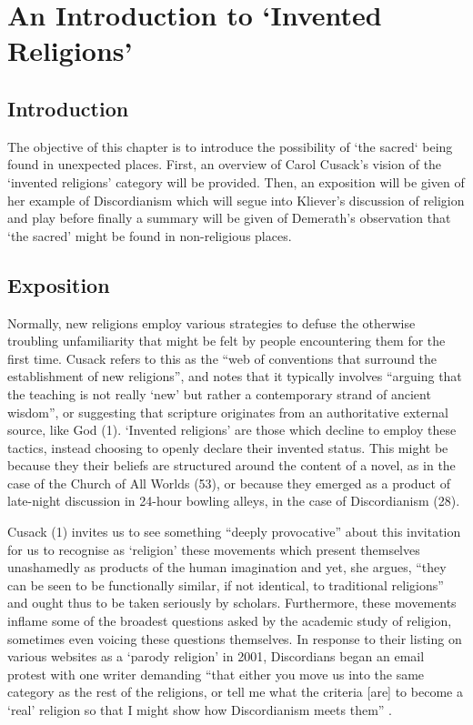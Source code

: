 \documentclass[Draft.tex]{subfiles}
\begin{document}
\chapter{An Introduction to `Invented Religions'}

\section*{Introduction}
The objective of this chapter is to introduce the possibility of
`the sacred` being found in unexpected places.
First, an overview of Carol Cusack's vision of
the `invented religions' category will be provided.
Then, an exposition will be given of her example of Discordianism
which will segue into Kliever's discussion of religion and play
before finally a summary will be given of Demerath's observation
that `the sacred' might be found in non-religious places.


\section*{Exposition}
Normally, new religions employ various strategies
to defuse the otherwise troubling unfamiliarity
that might be felt by people encountering them for the first time.
Cusack refers to this as the
``web of conventions that surround the establishment of new religions'',
and notes that it typically involves
``arguing that the teaching is not really `new' but rather
a contemporary strand of ancient wisdom'',
or suggesting that scripture originates from
an authoritative external source, like God (1).
`Invented religions' are those which decline to employ these tactics,
instead choosing to openly declare their invented status.
This might be because they their beliefs are structured around
the content of a novel,
as in the case of the Church of All Worlds (53),
or because they emerged as a product of late-night discussion in
24-hour bowling alleys, in the case of Discordianism (28).

Cusack (1) invites us to see something ``deeply provocative''
about this invitation for us to recognise as `religion'
these movements which present themselves unashamedly as
products of the human imagination and yet, she argues,
``they can be seen to be functionally similar, if not identical,
to traditional religions''
and ought thus to be taken seriously by scholars.
Furthermore, these movements inflame some of
the broadest questions asked by the academic study of religion,
sometimes even voicing these questions themselves.
In response to their listing on various websites as a `parody religion'
in 2001, Discordians began an email protest with one writer demanding
``that either you move us into the same category
as the rest of the religions, or tell me what the criteria [are]
to become a `real' religion so that I might show how Discordianism meets them''
\parencite[209]{Chidester05}.
\end{document}
